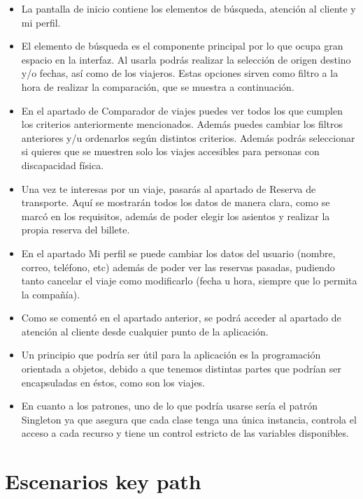\begin{itemize}
    \item La pantalla de inicio contiene los elementos de búsqueda, atención al cliente y mi perfil.
    \item El elemento de búsqueda es el componente principal por lo que ocupa gran espacio en la interfaz. Al usarla podrás realizar la selección de origen destino y/o fechas, así como de los viajeros. Estas opciones sirven como filtro a la hora de realizar la comparación, que se muestra a continuación.
    \item En el apartado de Comparador de viajes puedes ver todos los que cumplen los criterios anteriormente mencionados. Además puedes cambiar los filtros anteriores y/u ordenarlos según distintos criterios. Además podrás seleccionar si quieres que se muestren solo los viajes accesibles para personas con discapacidad física.
    \item Una vez te interesas por un viaje, pasarás al apartado de Reserva de transporte. Aquí se mostrarán todos los datos de manera clara, como se marcó en los requisitos, además de poder elegir los asientos y realizar la propia reserva del billete.
    \item En el apartado Mi perfil se puede cambiar los datos del usuario (nombre, correo, teléfono, etc) además de poder ver las reservas pasadas, pudiendo tanto cancelar el viaje como modificarlo (fecha u hora, siempre que lo permita la compañía).
    \item Como se comentó en el apartado anterior, se podrá acceder al apartado de atención al cliente desde cualquier punto de la aplicación.
    \item Un principio que podría ser útil para la aplicación es la programación orientada a objetos, debido a que tenemos distintas partes que podrían ser encapsuladas en éstos, como son los viajes.
    \item En cuanto a los patrones, uno de lo que podría usarse sería el patrón Singleton ya que asegura que cada clase tenga una única instancia, controla el acceso a cada recurso y tiene un control estricto de las variables disponibles.
    
\end{itemize}

\section{Escenarios key path}

